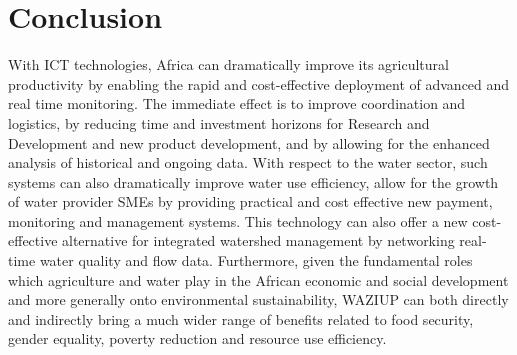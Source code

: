 
\section{Conclusion}
With ICT technologies, Africa can dramatically improve its agricultural productivity by enabling the rapid and cost-effective deployment of advanced and real time monitoring.
The immediate effect is to improve coordination and logistics, by reducing time and investment horizons for Research and Development and new product development, and by allowing for the enhanced analysis of historical and ongoing data. 
With respect to the water sector, such systems can also dramatically improve water use efficiency, allow for the growth of water provider SMEs by providing practical and cost effective new payment, monitoring and management systems.
This technology can also offer a new cost-effective alternative for integrated watershed management by networking real-time water quality and flow data. 
Furthermore, given the fundamental roles which agriculture and water play in the African economic and social development and more generally onto environmental sustainability, WAZIUP can both directly and indirectly bring a much wider range of benefits related to food security, gender equality, poverty reduction and resource use efficiency.

